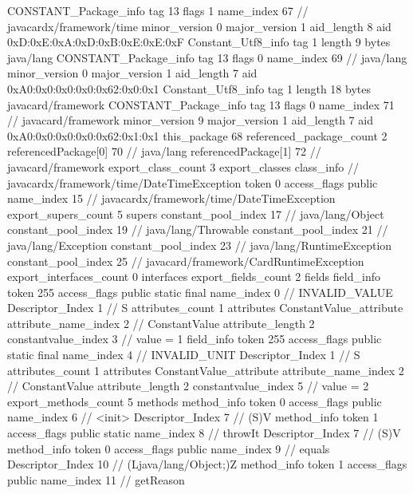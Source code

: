 {{{		}
		CONSTANT_Package_info {
			tag	13
			flags	1
			name_index	67		// javacardx/framework/time
			minor_version	0
			major_version	1
			aid_length	8
			aid	0xD:0xE:0xA:0xD:0xB:0xE:0xE:0xF
		}
		Constant_Utf8_info {
			tag	1
			length	9
			bytes	java/lang
		}
		CONSTANT_Package_info {
			tag	13
			flags	0
			name_index	69		// java/lang
			minor_version	0
			major_version	1
			aid_length	7
			aid	0xA0:0x0:0x0:0x0:0x62:0x0:0x1
		}
		Constant_Utf8_info {
			tag	1
			length	18
			bytes	javacard/framework
		}
		CONSTANT_Package_info {
			tag	13
			flags	0
			name_index	71		// javacard/framework
			minor_version	9
			major_version	1
			aid_length	7
			aid	0xA0:0x0:0x0:0x0:0x62:0x1:0x1
		}
	}
	this_package	68
	referenced_package_count	2
	referencedPackage[0]	70		// java/lang
	referencedPackage[1]	72		// javacard/framework
	export_class_count	3
	export_classes {
		class_info {		// javacardx/framework/time/DateTimeException
			token	0
			access_flags	public
			name_index	15		// javacardx/framework/time/DateTimeException
			export_supers_count	5
			supers {
				constant_pool_index	17		// java/lang/Object
				constant_pool_index	19		// java/lang/Throwable
				constant_pool_index	21		// java/lang/Exception
				constant_pool_index	23		// java/lang/RuntimeException
				constant_pool_index	25		// javacard/framework/CardRuntimeException
			}
			export_interfaces_count	0
			interfaces {
			}
			export_fields_count	2
			fields {
			field_info {
				token	255
				access_flags	public static final
				name_index	0		// INVALID_VALUE
				Descriptor_Index	1		// S
				attributes_count	1
				attributes {
				ConstantValue_attribute {
					attribute_name_index	2		// ConstantValue
					attribute_length	2
					constantvalue_index	3		// value = 1
				}
				}
			}
			field_info {
				token	255
				access_flags	public static final
				name_index	4		// INVALID_UNIT
				Descriptor_Index	1		// S
				attributes_count	1
				attributes {
				ConstantValue_attribute {
					attribute_name_index	2		// ConstantValue
					attribute_length	2
					constantvalue_index	5		// value = 2
				}
				}
			}
			}
			export_methods_count	5
			methods {
				method_info {
					token	0
					access_flags	public
					name_index	6		// <init>
					Descriptor_Index	7		// (S)V
				}
				method_info {
					token	1
					access_flags	public static
					name_index	8		// throwIt
					Descriptor_Index	7		// (S)V
				}
				method_info {
					token	0
					access_flags	public
					name_index	9		// equals
					Descriptor_Index	10		// (Ljava/lang/Object;)Z
				}
				method_info {
					token	1
					access_flags	public
					name_index	11		// getReason
}}}}}
